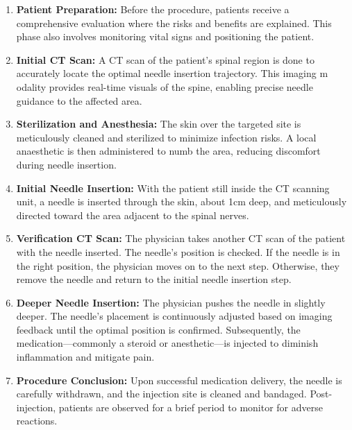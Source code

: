 \documentclass[12pt]{article}
\begin{document}
\begin{enumerate}
    \item \textbf{Patient Preparation:} Before the procedure, patients receive a comprehensive evaluation where the risks and benefits are explained. This phase also involves monitoring vital signs and positioning the patient.
    
    \item \textbf{Initial CT Scan:} A CT scan of the patient's spinal region is done to accurately locate the optimal needle insertion trajectory. This imaging m
    odality provides real-time visuals of the spine, enabling precise needle guidance to the affected area.
    
    \item \textbf{Sterilization and Anesthesia:} The skin over the targeted site is meticulously cleaned and sterilized to minimize infection risks. A local anaesthetic is then administered to numb the area, reducing discomfort during needle insertion.
    
    \item \textbf{Initial Needle Insertion:} With the patient still inside the CT scanning unit, a needle is inserted through the skin, about 1cm deep, and meticulously directed toward the area adjacent to the spinal nerves.

    \item \textbf{Verification CT Scan:} The physician takes another CT scan of the patient with the needle inserted. The needle's position is checked. If the needle is in the right position, the physician moves on to the next step. Otherwise, they remove the needle and return to the initial needle insertion step.

    \item \textbf{Deeper Needle Insertion:} The physician pushes the needle in slightly deeper. The needle's placement is continuously adjusted based on imaging feedback until the optimal position is confirmed. Subsequently, the medication—commonly a steroid or anesthetic—is injected to diminish inflammation and mitigate pain.

    \item \textbf{Procedure Conclusion:} Upon successful medication delivery, the needle is carefully withdrawn, and the injection site is cleaned and bandaged. Post-injection, patients are observed for a brief period to monitor for adverse reactions.
\end{enumerate}
\end{document}
